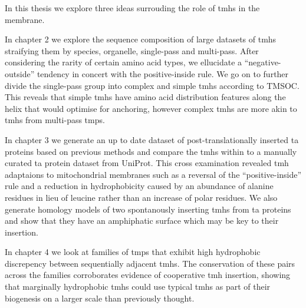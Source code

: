In this thesis we explore three ideas surrouding the role of \gls{tmh}s in the membrane.

In chapter 2 we explore the sequence composition of large datasets of \gls{tmh}s straifying them by species, organelle, single\--pass and multi\--pass.
After considering the rarity of certain amino acid types, we ellucidate a ``negative\--outside'' tendency in concert with the positive\--inside rule.
We go on to further divide the single\--pass group into complex and simple \gls{tmh}s according to TMSOC.
This reveals that simple \gls{tmh}s have amino acid distribution features along the helix that would optimise for anchoring, however complex \gls{tmh}s are more akin to \gls{tmh}s from multi\--pass \gls{tmp}s.

In chapter 3 we generate an up to date dataset of post\--translationally inserted \gls{ta} proteins based on previous methods and compare the \gls{tmh}s within to a manually curated \gls{ta} protein dataset from UniProt.
This cross examination revealed \gls{tmh} adaptaions to mitochondrial membranes such as a reversal of the ``positive\--inside'' rule and a reduction in hydrophobicity caused by an abundance of alanine residues in lieu of leucine rather than an increase of polar residues.
We also generate homology models of two spontanously inserting \gls{tmh}s from \gls{ta} proteins and show that they have an amphiphatic surface which may be key to their insertion.

In chapter 4 we look at families of \gls{tmp}s that exhibit high hydrophobic discrepency between sequentially adjacent \gls{tmh}s.
The conservation of these pairs across the families corroborates evidence of cooperative \gls{tmh} insertion, showing that marginally hydrophobic \gls{tmh}s could use typical \gls{tmh}s as part of their biogenesis on a larger scale than previously thought.
